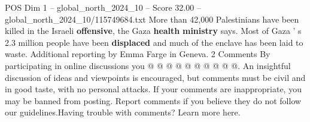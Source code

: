 \begin{textsample}{POS Dim 1 – global\_north\_2024\_10 – Score 32.00 – global\_north\_2024\_10/115749684.txt}
More than 42,000 Palestinians have been killed in the Israeli \textbf{offensive}, the Gaza \textbf{health} \textbf{ministry} says.
Most of Gaza ' s 2.3 million people have been \textbf{displaced} and much of the enclave has been laid to waste.
Additional reporting by Emma Farge in Geneva. 2 Comments By participating in online discussions you @ @ @ @ @ @ @ @ @ @.
An insightful discussion of ideas and viewpoints is encouraged, but comments must be civil and in good taste, with no personal attacks.
If your comments are inappropriate, you may be banned from posting.
Report comments if you believe they do not follow our guidelines.Having trouble with comments?
Learn more here.

\end{textsample}
